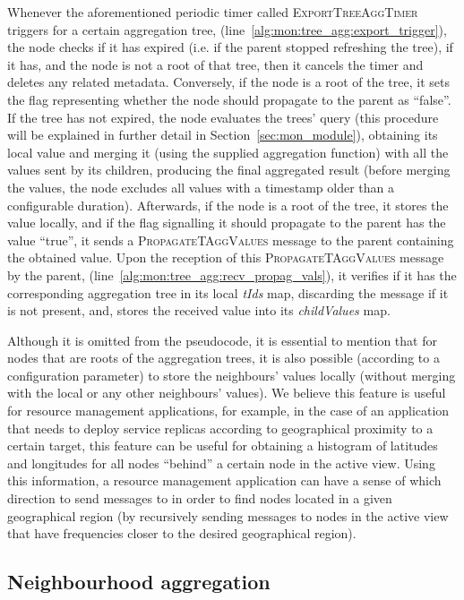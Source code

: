 Whenever the aforementioned periodic timer called \textsc{ExportTreeAggTimer} triggers for a certain aggregation tree, (line~\ref{alg:mon:tree_agg:export_trigger}), the node checks if it has expired (i.e. if the parent stopped refreshing the tree), if it has, and the node is not a root of that tree, then it cancels the timer and deletes any related metadata. Conversely, if the node is a root of the tree, it sets the flag representing whether the node should propagate to the parent as ``false''. If the tree has not expired, the node evaluates the trees' query (this procedure will be explained in further detail in Section~\ref{sec:mon_module}), obtaining its local value and merging it (using the supplied aggregation function) with all the values sent by its children, producing the final aggregated result (before merging the values, the node excludes all values with a timestamp older than a configurable duration).  Afterwards, if the node is a root of the tree, it stores the value locally, and if the flag signalling it should propagate to the parent has the value ``true'', it sends a \textsc{PropagateTAggValues} message to the parent containing the obtained value. Upon the reception of this \textsc{PropagateTAggValues} message by the parent, (line~\ref{alg:mon:tree_agg:recv_propag_vals}), it verifies if it has the corresponding aggregation tree in its local \textit{tIds} map, discarding the message if it is not present, and, stores the received value into its \textit{childValues} map.

Although it is omitted from the pseudocode, it is essential to mention that for nodes that are roots of the aggregation trees, it is also possible (according to a configuration parameter) to store the neighbours' values locally (without merging with the local or any other neighbours' values). We believe this feature is useful for resource management applications, for example, in the case of an application that needs to deploy service replicas according to geographical proximity to a certain target, this feature can be useful for obtaining a histogram of latitudes and longitudes for all nodes ``behind'' a certain node in the active view. Using this information, a resource management application can have a sense of which direction to send messages to in order to find nodes located in a given geographical region (by recursively sending messages to nodes in the active view that have frequencies closer to the desired geographical region).

\subsection{Neighbourhood aggregation} \label{sec:mon_protocol:neigh_agg}

